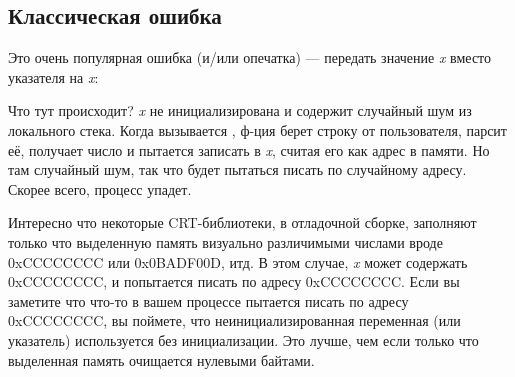 \subsection{Классическая ошибка}

Это очень популярная ошибка (и/или опечатка) --- передать значение \emph{x} вместо указателя на \emph{x}:



Что тут происходит?
\emph{x} не инициализирована и содержит случайный шум из локального стека.
Когда вызывается \scanf, ф-ция берет строку от пользователя, парсит её, получает число и пытается записать в \emph{x}, считая его
как адрес в памяти.
Но там случайный шум, так что \scanf будет пытаться писать по случайному адресу.
Скорее всего, процесс упадет.

Интересно что некоторые \ac{CRT}-библиотеки, в отладочной сборке, заполняют только что выделенную память 
визуально различимыми числами вроде 0xCCCCCCCC или 0x0BADF00D, итд.
В этом случае, \emph{x} может содержать 0xCCCCCCCC, и \scanf попытается писать по адресу 0xCCCCCCCC.
Если вы заметите что что-то в вашем процессе пытается писать по адресу 0xCCCCCCCC, вы поймете,
что неинициализированная переменная (или указатель) используется без инициализации.
Это лучше, чем если только что выделенная память очищается нулевыми байтами.

